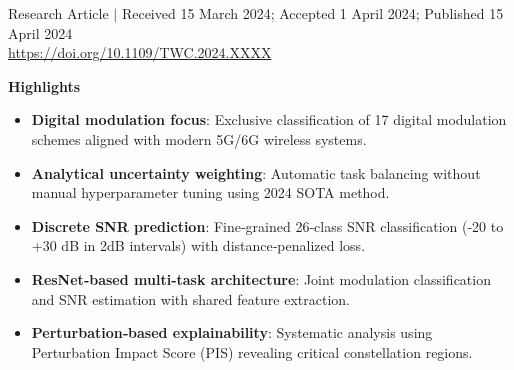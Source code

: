\documentclass{ELSP}
\begin{document}
\thispagestyle{firstpage}

\let\thefootnote\relax
{}

\begin{flushleft}
{\sffamily \small Research Article $\mid$ Received 15 March 2024; Accepted 1 April 2024; Published 15 April 2024}\\
{\sffamily \small\url{https://doi.org/10.1109/TWC.2024.XXXX}}




\end{flushleft}

\vspace{0.5em}
\noindent\textbf{\textcolor[RGB]{0,131,255}{Highlights}}
\begin{itemize}
  \item \textbf{Digital modulation focus}: Exclusive classification of 17 digital modulation schemes aligned with modern 5G/6G wireless systems.
  \item \textbf{Analytical uncertainty weighting}: Automatic task balancing without manual hyperparameter tuning using 2024 SOTA method.
  \item \textbf{Discrete SNR prediction}: Fine‑grained 26‑class SNR classification (-20 to +30 dB in 2dB intervals) with distance‑penalized loss.
  \item \textbf{ResNet‑based multi‑task architecture}: Joint modulation classification and SNR estimation with shared feature extraction.
  \item \textbf{Perturbation‑based explainability}: Systematic analysis using Perturbation Impact Score (PIS) revealing critical constellation regions.
\end{itemize}
\end{document}
